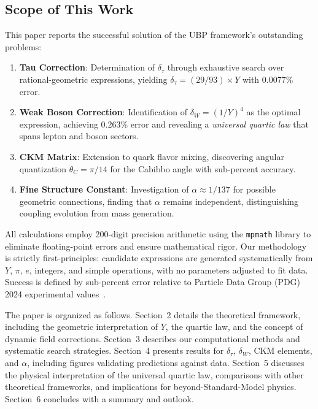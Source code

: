 \documentclass[11pt,a4paper]{article}
\begin{document}
\subsection{Scope of This Work}

This paper reports the successful solution of the UBP framework's outstanding problems:
\begin{enumerate}
\item \textbf{Tau Correction}: Determination of $\delta_\tau$ through exhaustive search over rational-geometric expressions, yielding $\delta_\tau = (29/93) \times Y$ with 0.0077\% error.

\item \textbf{Weak Boson Correction}: Identification of $\delta_W = (1/Y)^4$ as the optimal expression, achieving 0.263\% error and revealing a \emph{universal quartic law} that spans lepton and boson sectors.

\item \textbf{CKM Matrix}: Extension to quark flavor mixing, discovering angular quantization $\theta_C = \pi/14$ for the Cabibbo angle with sub-percent accuracy.

\item \textbf{Fine Structure Constant}: Investigation of $\alpha \approx 1/137$ for possible geometric connections, finding that $\alpha$ remains independent, distinguishing coupling evolution from mass generation.
\end{enumerate}

All calculations employ 200-digit precision arithmetic using the \texttt{mpmath} library to eliminate floating-point errors and ensure mathematical rigor. Our methodology is strictly first-principles: candidate expressions are generated systematically from $Y$, $\pi$, $e$, integers, and simple operations, with no parameters adjusted to fit data. Success is defined by sub-percent error relative to Particle Data Group (PDG) 2024 experimental values~\cite{ref007}.

The paper is organized as follows. Section~2 details the theoretical framework, including the geometric interpretation of $Y$, the quartic law, and the concept of dynamic field corrections. Section~3 describes our computational methods and systematic search strategies. Section~4 presents results for $\delta_\tau$, $\delta_W$, CKM elements, and $\alpha$, including figures validating predictions against data. Section~5 discusses the physical interpretation of the universal quartic law, comparisons with other theoretical frameworks, and implications for beyond-Standard-Model physics. Section~6 concludes with a summary and outlook.
\end{document}
